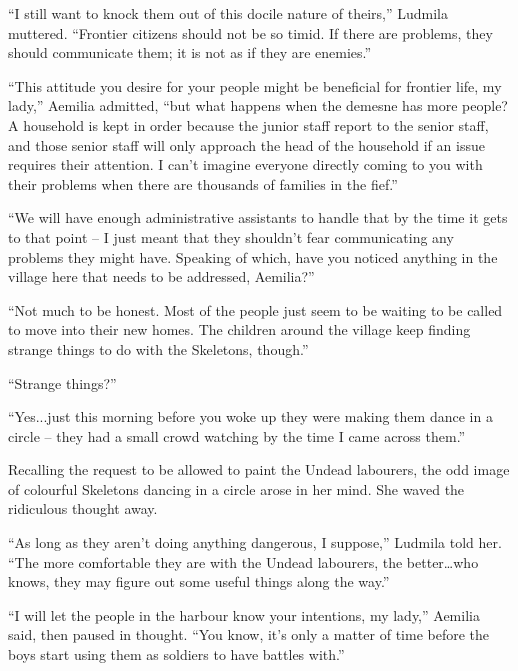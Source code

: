  

“I still want to knock them out of this docile nature of theirs,” Ludmila muttered. “Frontier citizens should not be so timid. If there are problems, they should communicate them; it is not as if they are enemies.”

 

“This attitude you desire for your people might be beneficial for frontier life, my lady,” Aemilia admitted, “but what happens when the demesne has more people? A household is kept in order because the junior staff report to the senior staff, and those senior staff will only approach the head of the household if an issue requires their attention. I can’t imagine everyone directly coming to you with their problems when there are thousands of families in the fief.”

 

“We will have enough administrative assistants to handle that by the time it gets to that point – I just meant that they shouldn’t fear communicating any problems they might have. Speaking of which, have you noticed anything in the village here that needs to be addressed, Aemilia?”

 

“Not much to be honest. Most of the people just seem to be waiting to be called to move into their new homes. The children around the village keep finding strange things to do with the Skeletons, though.”

 

“Strange things?”

 

“Yes...just this morning before you woke up they were making them dance in a circle – they had a small crowd watching by the time I came across them.”

 

Recalling the request to be allowed to paint the Undead labourers, the odd image of colourful Skeletons dancing in a circle arose in her mind. She waved the ridiculous thought away.

 

“As long as they aren’t doing anything dangerous, I suppose,” Ludmila told her. “The more comfortable they are with the Undead labourers, the better…who knows, they may figure out some useful things along the way.”

 

“I will let the people in the harbour know your intentions, my lady,” Aemilia said, then paused in thought. “You know, it’s only a matter of time before the boys start using them as soldiers to have battles with.”

